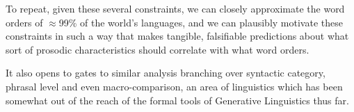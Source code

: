 \documentclass{article}
\begin{document}
To repeat, given these several constraints, we can closely approximate the word orders of $\approx$99\% of the world's languages, and we can plausibly motivate these constraints in such a way that makes tangible, falsifiable predictions about what sort of prosodic characteristics should correlate with what word orders.

It also opens to gates to similar analysis branching over syntactic category, phrasal level and even macro-comparison, an area of linguistics which has been somewhat out of the reach of the formal tools of Generative Linguistics thus far.

\printbibliography
\end{document}
